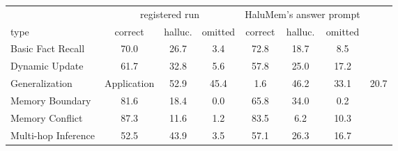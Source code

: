 \begin{gentable}
\centering
\small
\caption{\textbf{HaluMem by question type}: the registered run and the same Views answered with HaluMem's own answer prompt (gpt-4.1-mini judge; \% correct, hallucinated, omitted).}
\label{tab:halumem-types}
\begin{tabular}{@{}l ccc ccc@{}}
\toprule
&  &  \\
\cmidrule(lr){2-4}\cmidrule(l){5-7}
type & correct & halluc. & omitted & correct & halluc. & omitted \\
\midrule
Basic Fact Recall & 70.0 & 26.7 & 3.4 & 72.8 & 18.7 & 8.5 \\
Dynamic Update & 61.7 & 32.8 & 5.6 & 57.8 & 25.0 & 17.2 \\
Generalization & Application & 52.9 & 45.4 & 1.6 & 46.2 & 33.1 & 20.7 \\
Memory Boundary & 81.6 & 18.4 & 0.0 & 65.8 & 34.0 & 0.2 \\
Memory Conflict & 87.3 & 11.6 & 1.2 & 83.5 & 6.2 & 10.3 \\
Multi-hop Inference & 52.5 & 43.9 & 3.5 & 57.1 & 26.3 & 16.7 \\
\bottomrule
\end{tabular}
\end{gentable}
